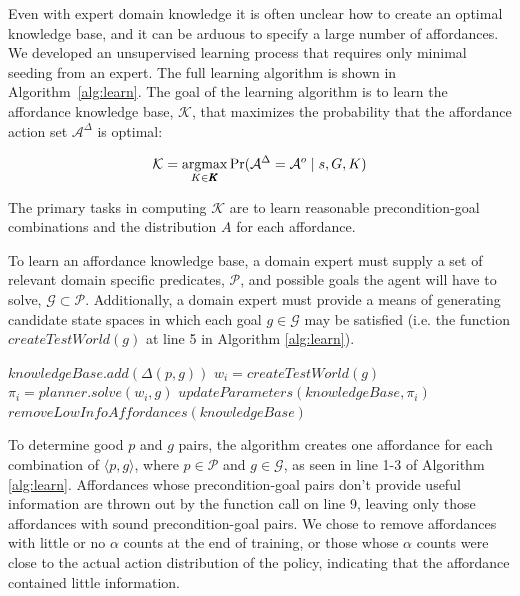 \documentclass[conference]{IEEEtran}
\newcommand{\argmax}{\operatornamewithlimits{argmax}}
\begin{document}
Even with expert domain knowledge it is often unclear how to create
an optimal knowledge base, and it can be arduous to specify a 
large number of affordances. We developed an unsupervised learning
process that requires only minimal seeding from an expert.
The full learning algorithm is shown in Algorithm~\ref{alg:learn}. The goal
of the learning algorithm is to learn the affordance knowledge base, $\mathcal{K}$,
that maximizes the probability that the affordance action set $\mathcal{A}^\Delta$ is optimal:

\begin{equation}
\mathcal{K} = \argmax_{K \in \pmb{K}} \Pr(\mathcal{A}^\Delta = \mathcal{A}^o \mid s, G, K)
\label{eq:learning_arg_max}
\end{equation}

The primary tasks in computing $\mathcal{K}$ are to learn reasonable precondition-goal 
combinations and the distribution $A$ for each affordance.

To learn an affordance knowledge base, a domain 
expert must supply a set of relevant domain specific predicates,
$\mathcal{P}$, and possible goals the agent will have to solve, $\mathcal{G}
\subset \mathcal{P}$. Additionally, a domain expert must provide a means 
of generating candidate state spaces in which each goal $g \in \mathcal{G}$
may be satisfied (i.e. the function $createTestWorld(g)$ at line 5 in Algorithm \ref{alg:learn}).

\begin{algorithm}
  \caption{$learn(\mathcal{P}, \mathcal{G})$}
  \begin{algorithmic}[1]
    \State $knowledgeBase.add(\Delta(p,g))$
    \EndFor
    \State $w_i = createTestWorld(g)$
    \State $\pi_i = planner.solve(w_i, g)$
    \State $updateParameters(knowledgeBase, \pi_i)$
    \EndFor
    \State $removeLowInfoAffordances(knowledgeBase)$
  \end{algorithmic}
  \label{alg:learn}
\end{algorithm}

To determine good $p$ and $g$ pairs, the algorithm creates one affordance for 
each combination of $\langle p, g \rangle$, where $p \in \mathcal{P}$ and $g
\in \mathcal{G}$, as seen in line 1-3 of Algorithm \ref{alg:learn}. Affordances
whose precondition-goal pairs don't provide useful information are thrown out 
by the function call on line 9, leaving only those affordances with sound 
precondition-goal pairs. We chose to remove affordances with little or no $\alpha$
counts at the end of training, or those whose $\alpha$ counts were close to the 
actual action distribution of the policy, indicating that the affordance contained little 
information.
\end{document}

